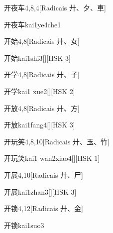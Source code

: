 \begin{entry}{开夜车}{4,8,4}[Radicais ⼶、⼣、⾞]
  \begin{phonetics}{开夜车}{kai1ye4che1}
  \end{phonetics}
\end{entry}

\begin{entry}{开始}{4,8}[Radicais ⼶、⼥]
  \begin{phonetics}{开始}{kai1shi3}[][HSK 3]
  \end{phonetics}
\end{entry}

\begin{entry}{开学}{4,8}[Radicais ⼶、⼦]
  \begin{phonetics}{开学}{kai1 xue2}[][HSK 2]
  \end{phonetics}
\end{entry}

\begin{entry}{开放}{4,8}[Radicais ⼶、⽅]
  \begin{phonetics}{开放}{kai1fang4}[][HSK 3]
  \end{phonetics}
\end{entry}

\begin{entry}{开玩笑}{4,8,10}[Radicais ⼶、⽟、⽵]
  \begin{phonetics}{开玩笑}{kai1 wan2xiao4}[][HSK 1]
  \end{phonetics}
\end{entry}

\begin{entry}{开展}{4,10}[Radicais ⼶、⼫]
  \begin{phonetics}{开展}{kai1zhan3}[][HSK 3]
  \end{phonetics}
\end{entry}

\begin{entry}{开锁}{4,12}[Radicais ⼶、⾦]
  \begin{phonetics}{开锁}{kai1suo3}
  \end{phonetics}
\end{entry}

